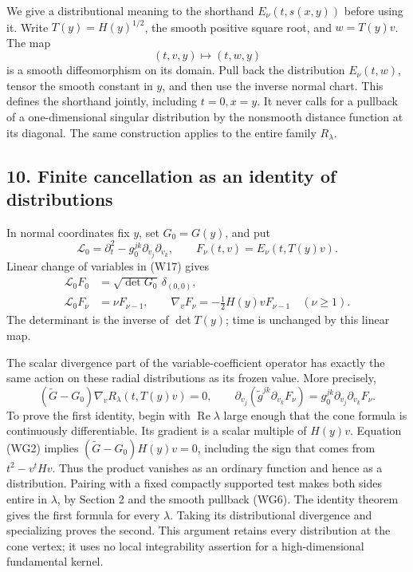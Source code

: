 \documentclass[
  11pt,
]{article}
\begin{document}
We give a distributional meaning to the shorthand \(E_\nu(t,s(x,y))\)
before using it. Write \(T(y)=H(y)^{1/2}\), the smooth positive square
root, and \(w=T(y)v\). The map \[
 (t,v,y)\longmapsto(t,w,y)
 \tag{WG6}
\] is a smooth diffeomorphism on its domain. Pull back the distribution
\(E_\nu(t,w)\), tensor the smooth constant in \(y\), and then use the
inverse normal chart. This defines the shorthand jointly, including
\(t=0,x=y\). It never calls for a pullback of a one-dimensional singular
distribution by the nonsmooth distance function at its diagonal. The
same construction applies to the entire family \(R_\lambda\).

\subsection{10. Finite cancellation as an identity of
distributions}\label{finite-cancellation-as-an-identity-of-distributions}

In normal coordinates fix \(y\), set \(G_0=G(y)\), and put \[
 \mathscr L_0=\partial_t^2-g_0^{jk}\partial_{v_j}\partial_{v_k},
 \qquad F_\nu(t,v)=E_\nu(t,T(y)v).
 \tag{WG7}
\] Linear change of variables in (W17) gives \[
\begin{split}
 \mathscr L_0F_0&=\sqrt{\det G_0}\,\delta_{(0,0)},\\
 \mathscr L_0F_\nu&=\nu F_{\nu-1},\qquad
 \nabla_vF_\nu=-\tfrac12H(y)v F_{\nu-1}\quad(\nu\geq1).
\end{split}
 \tag{WG8}
\] The determinant is the inverse of \(\det T(y)\); time is unchanged by
this linear map.

The scalar divergence part of the variable-coefficient operator has
exactly the same action on these radial distributions as its frozen
value. More precisely, \[
 (\widetilde G-G_0)\nabla_vR_\lambda(t,T(y)v)=0,
 \qquad
 \partial_{v_j}(\widetilde g^{jk}\partial_{v_k}F_\nu)
       =g_0^{jk}\partial_{v_j}\partial_{v_k}F_\nu.
 \tag{WG9}
\] To prove the first identity, begin with \(\operatorname{Re}\lambda\)
large enough that the cone formula is continuously differentiable. Its
gradient is a scalar multiple of \(H(y)v\). Equation (WG2) implies
\((\widetilde G-G_0)H(y)v=0\), including the sign that comes from
\(t^2-v^tHv\). Thus the product vanishes as an ordinary function and
hence as a distribution. Pairing with a fixed compactly supported test
makes both sides entire in \(\lambda\), by Section 2 and the smooth
pullback (WG6). The identity theorem gives the first formula for every
\(\lambda\). Taking its distributional divergence and specializing
proves the second. This argument retains every distribution at the cone
vertex; it uses no local integrability assertion for a high-dimensional
fundamental kernel.
\end{document}
